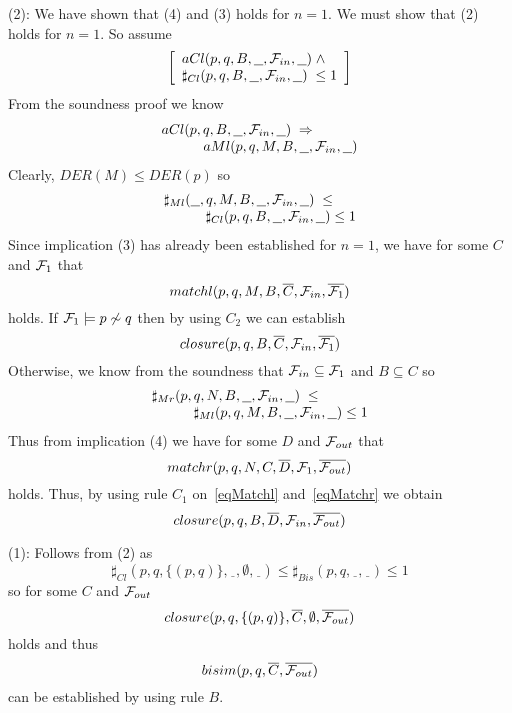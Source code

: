 \begin{theorem}
\begin{trivlist}
\item[\rm (2):]  
We have shown that (4) and (3) holds for $n=1$. We must show that (2) holds for $n=1$. So assume
\[
\left[\begin{array}{l}
aCl(p,q,B,\underline{\ \ },{\cal F}_{in},\underline{\ \ })\;\wedge\\
\sharp_{Cl}(p,q,B,\underline{\ \ },{\cal F}_{in},\underline{\ \ })\;\leq 1
\end{array}\right]
\]
From the soundness proof we know
\[
\begin{array}{llll}
\multicolumn{4}{l}{aCl(p,q,B,\underline{\ \ },{\cal F}_{in},\underline{\ \ })\;\Rightarrow}\\
&&& aMl(p,q,M,B,\underline{\ \ },{\cal F}_{in},\underline{\ \ })
\end{array}
\]
Clearly, $DER(M)\leq DER(p)$ so
\[
\begin{array}{llll}
\multicolumn{4}{l}{\sharp_{Ml}(\underline{\ \ },q,M,B,\underline{\ \ },{\cal F}_{in},\underline{\ \ })\;\leq}\\
&&&\sharp_{Cl}(p,q,B,\underline{\ \ },{\cal F}_{in},\underline{\ \ }) \leq 1
\end{array}
\]
Since implication (3) has already been established for $n=1$, we have for some $C$ and ${\cal F}_{1}$ that
\begin{equation}\label{eqMatchl}
matchl(p,q,M,B,\overline{C},{\cal F}_{in},\overline{{\cal F}_{1}})
\end{equation}
holds. If ${\cal F}_{1}\models p\not\sim q$ then by using $C_2$ we can establish
\[
closure(p,q,B,\overline{C},{\cal F}_{in},\overline{{\cal F}_{1}})
\]
Otherwise, we know from the soundness that ${\cal F}_{in}\subseteq{\cal F}_{1}$ and $B\subseteq C$ so
\[
\begin{array}{llll}
\multicolumn{4}{l}{\sharp_{Mr}(p,q,N,B,\underline{\ \ },{\cal F}_{in},\underline{\ \ })\;\leq}\\
&&&\sharp_{Ml}(p,q,M,B,\underline{\ \ },{\cal F}_{in},\underline{\ \ }) \leq 1
\end{array}
\]
Thus from implication (4) we have for some $D$ and ${\cal F}_{out}$ that
\begin{equation}\label{eqMatchr}
matchr(p,q,N,C,\overline{D},{\cal F}_{1},\overline{{\cal F}_{out}})
\end{equation}
holds. Thus, by using rule $C_1$ on~\ref{eqMatchl} and~\ref{eqMatchr} we obtain
\[
closure(p,q,B,\overline{D},{\cal F}_{in},\overline{{\cal F}_{out}})
\]


\item[\rm (1):]
Follows from (2) as
\[
\sharp_{Cl}(p,q,\{(p,q)\},\underline{\ \ },\emptyset,\underline{\ \ }) \leq
\sharp_{Bis}(p,q,\underline{\ \ },\underline{\ \ }) \leq 1
\]
so for some  $C$ and ${\cal F}_{out}$
\[
closure(p,q,\{(p,q)\},\overline{C},\emptyset,\overline{{\cal F}_{out}})
\]
holds and thus
\[
bisim(p,q,\overline{C},\overline{{\cal F}_{out}})
\]
can be established by using rule $B$.


\end{trivlist}
\end{theorem}
